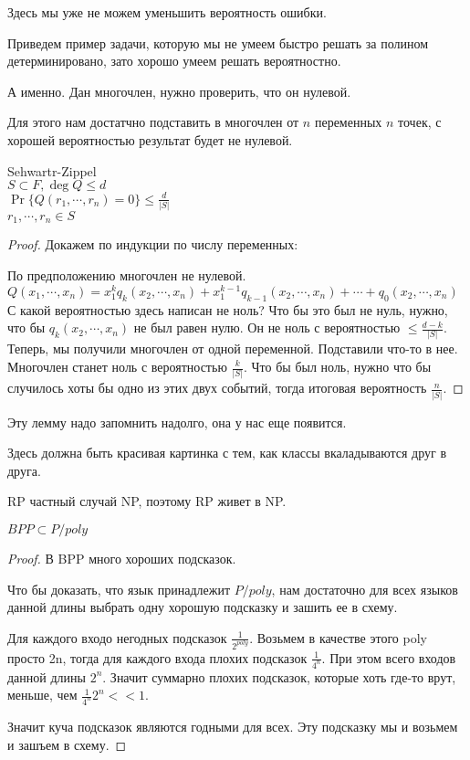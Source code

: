 Здесь мы уже не можем уменьшить вероятность ошибки.


\begin{exmp} 
Приведем пример задачи, которую мы не умеем быстро решать 
за полином детерминировано, зато хорошо умеем решать вероятностно. 

А именно. Дан многочлен, нужно проверить, что он нулевой. 

Для этого нам достатчно подставить в многочлен от $n$ переменных $n$ точек, 
с хорошей вероятностью результат будет не нулевой. 

\begin{lemma} Sehwartr-Zippel\\
$S \subset F, \deg Q \le d$\\
$\Pr\{Q(r_1, \cdots, r_n) = 0\} \le \frac{d}{|S|}$\\
$r_1, \cdots, r_n \in S$\\
\end{lemma}
\begin{proof}
Докажем по индукции по числу переменных:

По предположению многочлен не нулевой. 
$Q(x_1, \cdots, x_n) = x_1^kq_k(x_2,\cdots, x_n) + x_1^{k - 1}q_{k - 1}(x_2, \cdots, x_n) + \cdots + q_0(x_2, \cdots, x_n)$\\
С какой вероятностью здесь написан не ноль? Что бы это был не нуль, нужно, что бы $q_k(x_2, \cdots, x_n)$ не был равен нулю. 
Он не ноль с вероятностью $\le \frac{d - k}{|S|}$. Теперь, мы получили многочлен от одной переменной. Подставили что-то в нее. 
Многочлен станет ноль с вероятностью $\frac{k}{|S|}$. Что бы был ноль, нужно что бы случилось хоты бы одно из этих двух событий, 
тогда итоговая вероятность $\frac{n}{|S|}$.
\end{proof}
\end{exmp}

Эту лемму надо запомнить надолго, она у нас еще появится.

Здесь должна быть красивая картинка с тем, как классы вкаладываются друг в друга. 

RP частный случай NP, поэтому RP живет в NP.
\begin{theorem}
$BPP \subset P/poly$\\
\end{theorem}
\begin{proof}
В BPP много хороших подсказок. 

Что бы доказать, что язык принадлежит $P/poly$, нам достаточно для всех языков 
данной длины выбрать одну хорошую подсказку и зашить ее в схему.

Для каждого входо негодных подсказок $\frac{1}{2^{poly}} $. Возьмем в качестве этого poly просто 2n, 
тогда для каждого входа плохих подсказок $\frac{1}{4^n}$. При этом всего входов данной длины $2^n$. Значит 
суммарно плохих подсказок, которые хоть где-то врут, меньше, чем $\frac{1}{4^n}2^n << 1$.

Значит куча подсказок являются годными для всех. Эту подсказку мы и возьмем и зашъем в схему.
\end{proof}

